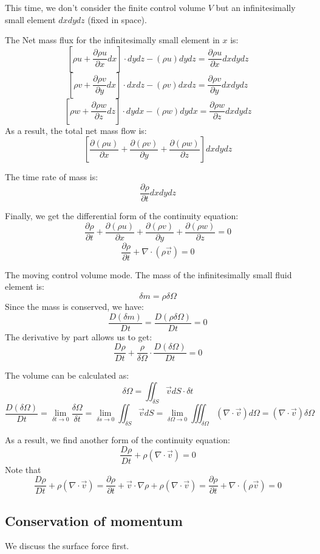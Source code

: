 \documentclass[11pt]{article} %
\begin{document}
This time, we don't consider the finite control volume $V$ but an infinitesimally small element $dxdydz$ (fixed in space).\par
The Net mass flux for the infinitesimally small element in $x$ is:
$$
\left[ \rho u + \frac{\partial \rho u}{\partial x}dx\right] \cdot dydz 
-(\rho u) dydz = \frac{\partial \rho u}{\partial x}dxdydz
$$
$$
\left[ \rho v + \frac{\partial \rho v}{\partial y}dx\right] \cdot dxdz 
-(\rho v) dxdz = \frac{\partial \rho v}{\partial y}dxdydz
$$
$$
\left[ \rho w + \frac{\partial \rho w}{\partial z}dz\right] \cdot dydx 
-(\rho w) dydx = \frac{\partial \rho w}{\partial z}dxdydz
$$As a result, the total net mass flow is:
$$
\left[\frac{\partial (\rho u)}{\partial x}+\frac{\partial (\rho v)}{\partial y}+ \frac{\partial (\rho w)}{\partial z}\right]dxdydz
$$\par
The time rate of mass is:
$$
\frac{\partial \rho}{\partial t}dxdydz
$$\par
Finally, we get the differential form of the continuity equation:
\begin{equation}
\frac{\partial \rho}{\partial t} +\frac{\partial (\rho u)}{\partial x}+\frac{\partial (\rho v)}{\partial y}+ \frac{\partial (\rho w)}{\partial z} = 0
\end{equation}
$$
\frac{\partial \rho}{\partial t} +\nabla \cdot(\rho \vec{v})=0
$$\par
The moving control volume mode. The mass of the infinitesimally small fluid element is:
$$
\delta m = \rho \delta \Omega
$$
Since the mass is conserved, we have:
$$
\frac{D (\delta m)}{Dt} = \frac{D (\rho \delta \Omega)}{Dt}= 0
$$
The derivative by part allows us to get:
$$
\frac{D \rho}{Dt} + \frac{\rho}{\delta \Omega}\cdot\frac{D ( \delta \Omega)}{Dt}= 0
$$\par
The volume can be calculated as:
$$
\delta \Omega = \iint_{\delta S}\vec{v}dS \cdot \delta t
$$
$$
\frac{D ( \delta \Omega)}{Dt} =\lim_{\delta t \to 0} \frac{\delta \Omega}{\delta t}=\lim_{\delta s \to 0}\iint_{\delta S}\vec{v}dS =\lim_{\delta \Omega \to 0}\iiint_{\delta \Omega} (\nabla \cdot \vec{v})d \Omega = (\nabla \cdot \vec{v})\delta \Omega
$$\par
As a result, we find another form of the continuity equation:
\begin{equation}
\frac{D \rho}{Dt} + \rho  (\nabla \cdot \vec{v})= 0
\end{equation}
Note that
$$
\frac{D \rho}{Dt} + \rho  (\nabla \cdot \vec{v}) = \frac{\partial \rho}{\partial t} + \vec{v} \cdot\nabla \rho + \rho  (\nabla \cdot \vec{v}) = \frac{\partial \rho}{\partial t} + \nabla \cdot(\rho \vec{v})=0
$$

\subsection{Conservation of momentum}
\hspace{5mm} We discuss the surface force first. 
\end{document}

